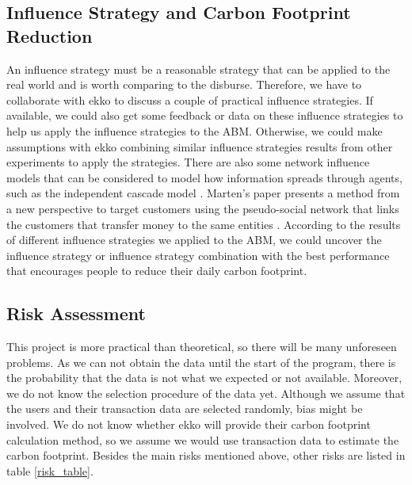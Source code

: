 \documentclass[a4paper,11pt]{article}
\begin{document}
\subsection{Influence Strategy and Carbon Footprint Reduction}
An influence strategy must be a reasonable strategy that can be applied to the real world and is worth comparing to the disburse. Therefore, we have to collaborate with ekko to discuss a couple of practical influence strategies. If available, we could also get some feedback or data on these influence strategies to help us apply the influence strategies to the ABM. Otherwise, we could make assumptions with ekko combining similar influence strategies results from other experiments to apply the strategies.
There are also some network influence models that can be considered to model how information spreads through agents, such as the independent cascade model \cite{7}.
Marten's paper presents a method from a new perspective to target customers using the pseudo-social network that links the customers that transfer money to the same entities \cite{psn}.
According to the results of different influence strategies we applied to the ABM, we could uncover the influence strategy or influence strategy combination with the best performance that encourages people to reduce their daily carbon footprint.

\subsection{Risk Assessment}
This project is more practical than theoretical, so there will be many unforeseen problems.
As we can not obtain the data until the start of the program, there is the probability that the data is not what we expected or not available. Moreover, we do not know the selection procedure of the data yet. Although we assume that the users and their transaction data are selected randomly, bias might be involved. 
We do not know whether ekko will provide their carbon footprint calculation method, so we assume we would use transaction data to estimate the carbon footprint. Besides the main risks mentioned above, other risks are listed in table \ref{risk_table}.
\end{document}
